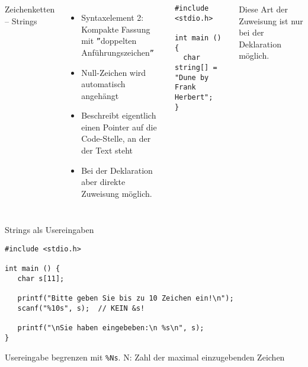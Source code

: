 \begin{frame}[fragile]
%
\begin{columns}[T]
\begin{Large}
{Zeichenketten -- Strings}
\vspace{6pt}
\end{Large}
%
\begin{itemize}
\item Syntaxelement 2: Kompakte Fassung mit \texttt{''}doppelten Anführungszeichen\texttt{''}
\item Null-Zeichen wird automatisch angehängt
\item Beschreibt eigentlich einen Pointer auf die Code-Stelle, an der der Text steht
\item Bei der Deklaration aber direkte Zuweisung möglich.
\end{itemize}
%
\begin{codebox}
\begin{verbatim}
#include <stdio.h>

int main () {
  char string[] = "Dune by Frank Herbert";
}
\end{verbatim}
\end{codebox}
%
\begin{warnbox}
Diese Art der Zuweisung ist nur bei der Deklaration möglich.
\end{warnbox}
%
\end{columns}
%
\end{frame}


\begin{frame}[fragile]{Strings als Usereingaben}
%
\begin{codebox}
\begin{verbatim}
#include <stdio.h>

int main () {
   char s[11];

   printf("Bitte geben Sie bis zu 10 Zeichen ein!\n");
   scanf("%10s", s);  // KEIN &s!

   printf("\nSie haben eingebeben:\n %s\n", s);
}
\end{verbatim}
\end{codebox}
%
\begin{hintbox}
Usereingabe begrenzen mit \texttt{\%Ns}. N: Zahl der maximal einzugebenden Zeichen
\end{hintbox}
%
\end{frame}

